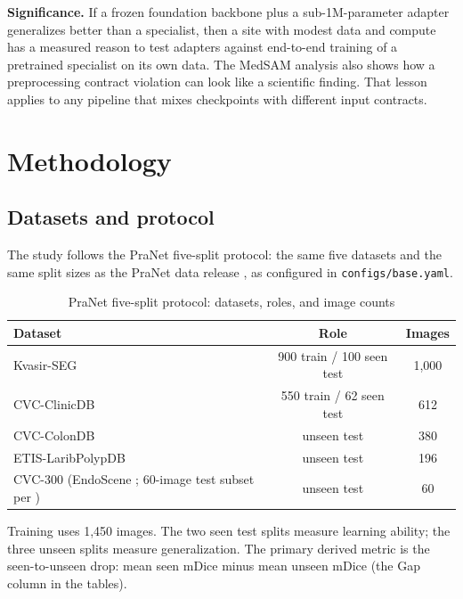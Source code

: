 \documentclass[conference]{IEEEtran}
\begin{document}
\textbf{Significance.} If a frozen foundation backbone plus a sub-1M-parameter adapter generalizes better than a specialist, then a site with modest data and compute has a measured reason to test adapters against end-to-end training of a pretrained specialist on its own data. The MedSAM analysis also shows how a preprocessing contract violation can look like a scientific finding. That lesson applies to any pipeline that mixes checkpoints with different input contracts.


\section{Methodology}\label{sec:4}

\subsection{Datasets and protocol}\label{sec:4.1}
The study follows the PraNet five-split protocol: the same five datasets and the same split sizes as the PraNet data release \cite{ref15}, as configured in \texttt{configs/base.yaml}.

\begin{table}[t]
\centering
\footnotesize
\caption{PraNet five-split protocol: datasets, roles, and image counts}
\label{tab:1}
\begin{tabular}{lcc}
\hline
\textbf{Dataset} & \textbf{Role} & \textbf{Images} \\
\hline
Kvasir-SEG \cite{ref8} & 900 train / 100 seen test & 1,000 \\
CVC-ClinicDB \cite{ref9} & 550 train / 62 seen test & 612 \\
CVC-ColonDB \cite{ref10} & unseen test & 380 \\
ETIS-LaribPolypDB \cite{ref11} & unseen test & 196 \\
CVC-300 (EndoScene \cite{ref12}; 60-image test subset per \cite{ref2,ref15}) & unseen test & 60 \\
\hline
\end{tabular}
\end{table}

Training uses 1,450 images. The two seen test splits measure learning ability; the three unseen splits measure generalization. The primary derived metric is the seen-to-unseen drop: mean seen mDice minus mean unseen mDice (the Gap column in the tables).
\end{document}
